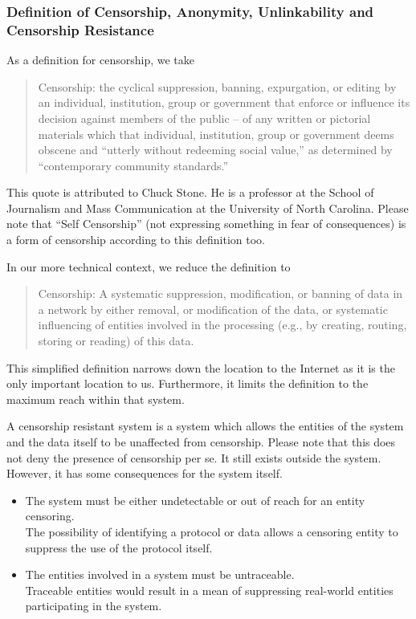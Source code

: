 \documentclass[10pt,journal,compsoc]{IEEEtran}
\begin{document}
\subsubsection{Definition of Censorship, Anonymity, Unlinkability and Censorship Resistance}
As a definition for censorship, we take
\begin{quote}
	Censorship: the cyclical suppression, banning, expurgation, or editing by an individual, institution, group or government that enforce or influence its decision against members of the public -- of any written or pictorial materials which that individual, institution, group or government deems obscene and ``utterly without redeeming social value,'' as determined by ``contemporary community standards.''
\end{quote}

This quote is attributed to Chuck Stone. He is a professor at the School of Journalism and Mass Communication at the University of North Carolina. Please note that ``Self Censorship'' (not expressing something in fear of consequences)  is a form of censorship according to this definition too.

In our more technical context, we reduce the definition to
\begin{quote}
	Censorship: A systematic suppression, modification, or banning of data in a network by either removal, or modification of the data, or systematic influencing of entities involved in the processing (e.g., by creating, routing, storing or reading) of this data.
\end{quote}
This simplified definition narrows down the location to the Internet as it is the only important location to us.  Furthermore, it limits the definition to the maximum reach within that system.

A censorship resistant system is a system which allows the entities of the system and the data itself to be unaffected from censorship. Please note that this does not deny the presence of censorship per se. It still exists outside the system. However, it has some consequences for the system itself.

\begin{itemize}
	\item The system must be either undetectable or out of reach for an entity censoring.\\
	The possibility of identifying a protocol or data allows a censoring entity to suppress the use of the protocol itself. 
	\item The entities involved in a system must be untraceable.\\
	Traceable entities would result in a mean of suppressing real-world entities participating in the system.
\end{itemize}
\end{document}

